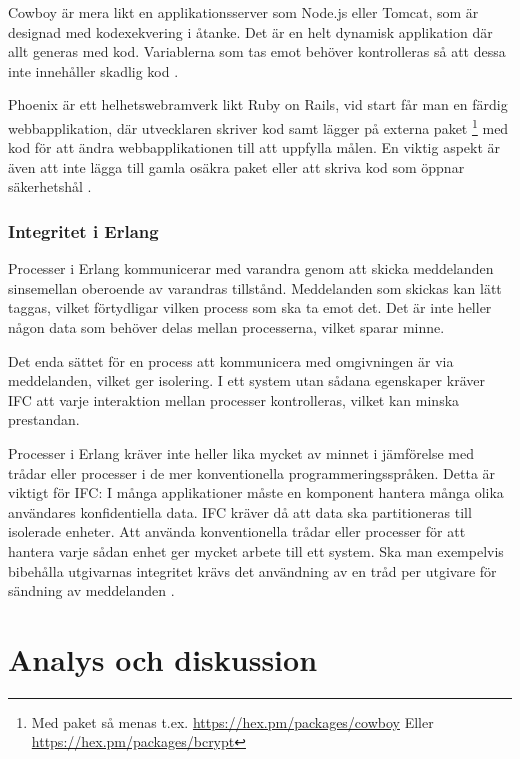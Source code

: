 \documentclass[12pt]{article}
\begin{document}
Cowboy är mera likt en applikationsserver som Node.js eller Tomcat, som är designad med kodexekvering i åtanke. Det är en helt dynamisk applikation där allt generas med kod. Variablerna som tas emot behöver kontrolleras så att dessa inte innehåller skadlig kod
\cite{cowboy}.

Phoenix är ett helhetswebramverk likt Ruby on Rails, vid start får man en färdig webbapplikation, där utvecklaren skriver kod samt lägger på externa paket
\footnote{Med paket så menas t.ex.
\url{https://hex.pm/packages/cowboy} Eller \url{https://hex.pm/packages/bcrypt} } med kod för att ändra webbapplikationen till att uppfylla målen. En viktig aspekt är även att inte lägga till gamla osäkra paket eller att skriva kod som öppnar säkerhetshål \cite{phoenix/ruby,phoenix/rails,phoenix}.




\subsubsection*{Integritet i Erlang } 
Processer i Erlang kommunicerar med varandra genom att skicka meddelanden sinsemellan oberoende av varandras tillstånd. Meddelanden som skickas kan lätt taggas, vilket förtydligar vilken process som ska ta emot det. Det är inte heller någon data som behöver delas mellan processerna, vilket sparar minne.

Det enda sättet för en process att kommunicera med omgivningen är via meddelanden, vilket ger isolering.  I ett system utan sådana egenskaper kräver IFC att varje interaktion mellan processer kontrolleras, vilket kan minska prestandan.
 
Processer i Erlang kräver inte heller lika mycket av minnet i jämförelse med trådar eller processer i de mer konventionella programmeringsspråken. Detta är viktigt för IFC: I många applikationer måste en komponent hantera många olika användares konfidentiella data. IFC kräver då att data ska partitioneras till isolerade enheter. Att använda konventionella trådar eller processer för att hantera varje sådan enhet ger mycket arbete till ett system. Ska man exempelvis bibehålla utgivarnas integritet krävs det användning av en tråd per utgivare för sändning av meddelanden
 \cite{IFC}.



\section{	Analys och diskussion}
\end{document}

